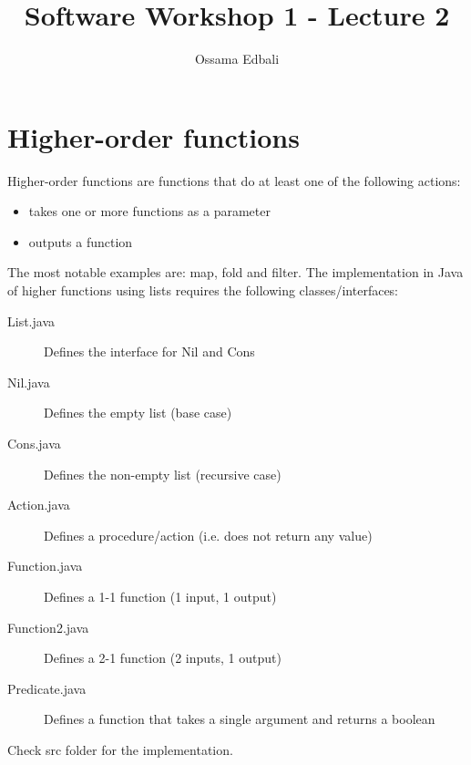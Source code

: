 \documentclass{article}
\title{Software Workshop 1 - Lecture 2}
\author{Ossama Edbali}
\begin{document}
	\maketitle
	
	\section{Higher-order functions}
	Higher-order functions are functions that do at least one of the following actions:
	\begin{itemize}
		\item takes one or more functions as a parameter
		\item outputs a function
	\end{itemize}
	
	The most notable examples are: map, fold and filter.
	The implementation in Java of higher functions using lists
	requires the following classes/interfaces:
	\begin{description}
		\item[List.java] Defines the interface for Nil and Cons
		\item[Nil.java] Defines the empty list (base case)
		\item[Cons.java] Defines the non-empty list (recursive case)
		\item[Action.java] Defines a procedure/action (i.e. does not return any value)
		\item[Function.java] Defines a 1-1 function (1 input, 1 output)
		\item[Function2.java] Defines a 2-1 function (2 inputs, 1 output)
		\item[Predicate.java] Defines a function that takes a single argument and returns a
		boolean
	\end{description}	
	
	Check src folder for the implementation.	
	
\end{document}
